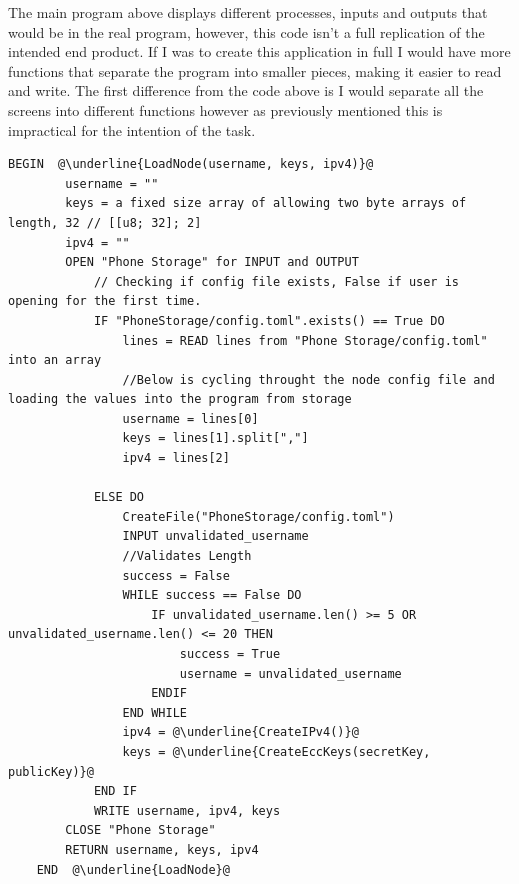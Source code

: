 \documentclass[a4paper, titlepage]{article}
\begin{document}
The main program above displays different processes, inputs and outputs that would be in the real program, however, this code isn't a full replication of the intended end product. If I was to create this application in full I would have more functions that separate the program into smaller pieces, making it easier to read and write. The first difference from the code above is I would separate all the screens into different functions however as previously mentioned this is impractical for the intention of the task.

\begin{lstlisting}[caption=Load Node, escapechar=\@]
	BEGIN  @\underline{LoadNode(username, keys, ipv4)}@
		username = ""
		keys = a fixed size array of allowing two byte arrays of length, 32 // [[u8; 32]; 2]
		ipv4 = ""
		OPEN "Phone Storage" for INPUT and OUTPUT
			// Checking if config file exists, False if user is opening for the first time.
			IF "PhoneStorage/config.toml".exists() == True DO
				lines = READ lines from "Phone Storage/config.toml" into an array
				//Below is cycling throught the node config file and loading the values into the program from storage
				username = lines[0]
				keys = lines[1].split[","]
				ipv4 = lines[2]

			ELSE DO
				CreateFile("PhoneStorage/config.toml")
				INPUT unvalidated_username
				//Validates Length
				success = False
				WHILE success == False DO
					IF unvalidated_username.len() >= 5 OR unvalidated_username.len() <= 20 THEN
						success = True
						username = unvalidated_username
					ENDIF
				END WHILE
				ipv4 = @\underline{CreateIPv4()}@
				keys = @\underline{CreateEccKeys(secretKey, publicKey)}@
			END IF
			WRITE username, ipv4, keys
		CLOSE "Phone Storage"
		RETURN username, keys, ipv4
	END  @\underline{LoadNode}@
\end{lstlisting}
\end{document}
